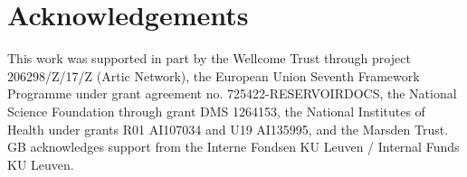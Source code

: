 \documentclass{bioinfo_tracer}
\begin{document}



\section*{Acknowledgements}

This work was supported in part by the Wellcome Trust through project 206298/Z/17/Z (Artic Network), the European Union Seventh Framework Programme under grant agreement no. 725422-RESERVOIRDOCS, the National Science Foundation through grant DMS 1264153, the National Institutes of Health under grants R01 AI107034 and U19 AI135995, and the Marsden Trust.
GB acknowledges support from the Interne Fondsen KU Leuven / Internal Funds KU Leuven.




\end{document}
